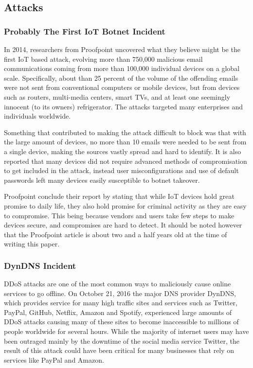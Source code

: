 \documentclass[a4paper, conference]{IEEEtran/IEEEtran}
\begin{document}
\subsection{Attacks}
\label{sec:attacks}
\subsubsection{Probably The First IoT Botnet Incident}
In 2014, researchers from Proofpoint uncovered what they believe might be the first IoT based attack, evolving more than 750,000 malicious email communications coming from more than 100,000 individual devices on a global scale.\cite{proofpoint} Specifically, about than 25 percent of the volume of the offending emails were not sent from conventional computers or mobile devices, but from devices such as routers, multi-media centers, smart TVs, and at least one seemingly innocent (to its owners) refrigerator. The attacks targeted many enterprises and individuals worldwide.

Something that contributed to making the attack difficult to block was that with the large amount of devices, no more than 10 emails were needed to be sent from a single device, making the sources vastly spread and hard to identify.\cite{proofpoint} It is also reported that many devices did not require advanced methods of compromisation to get included in the attack, instead user misconfigurations and use of default passwords left many devices easily susceptible to botnet takeover. 

Proofpoint conclude their report by stating that while IoT devices hold great promise to daily life, they also hold promise for criminal activity as they are easy to compromise. This being because vendors and users take few steps to make devices secure, and compromises are hard to detect.\cite{proofpoint} It should be noted however that the Proofpoint article is about two and a half years old at the time of writing this paper. %

\subsubsection{DynDNS Incident}
DDoS attacks are one of the most common ways to maliciously cause online services to go offline. On October 21, 2016 the major DNS provider DynDNS, which provides service for many high traffic sites and services such as Twitter, PayPal, GitHub, Netflix, Amazon and Spotify, experienced large amounts of DDoS attacks causing many of these sites to become inaccessible to millions of people worldwide for several hours.\cite{dynstatement} While the majority of internet users may have been outraged mainly by the downtime of the social media service Twitter, the result of this attack could have been critical for many businesses that rely on services like PayPal and Amazon.
\end{document}

